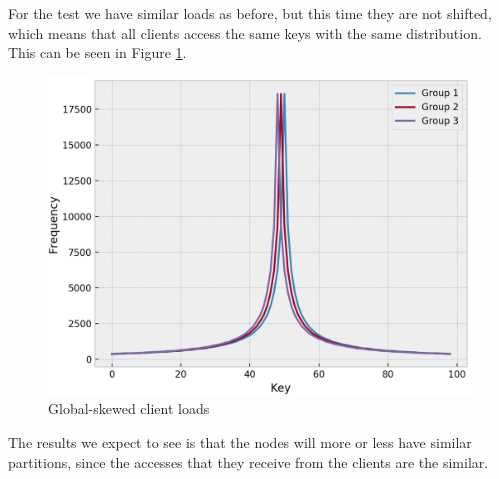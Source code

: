 For the test we have similar loads as before, but this time they are not shifted, which means that all clients access the same keys with the same distribution. This can be seen in Figure \ref{fig:global-skewed-loads}.

\begin{figure}[!htb]
  \centering
  \includegraphics[width=\textwidth,height=\textheight,keepaspectratio]{img/clients_loads_global.png}
  \caption{ Global-skewed client loads }
  \label{fig:global-skewed-loads}
\end{figure}

The results we expect to see is that the nodes will more or less have similar partitions, since the accesses that they receive from the clients are the similar.


